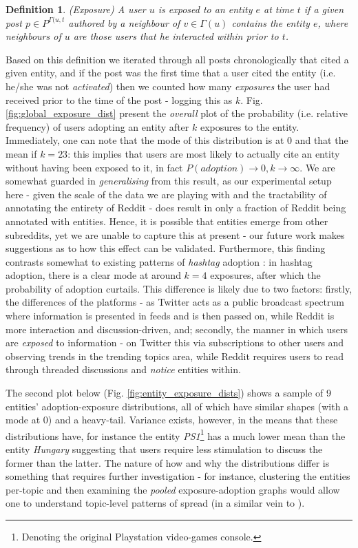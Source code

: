 \documentclass[journal,10pt,draftclsnofoot,onecolumn]{IEEEtran}
\newtheorem{mydef}{Definition}
\begin{document}
\begin{mydef}
\label{def:exposure}
(Exposure) A user $u$ is exposed to an entity $e$ at time $t$ if a given post $p \in P^{\Gamma(u,t}$ authored by a neighbour of $v \in \Gamma(u)$ contains the entity $e$, where neighbours of $u$ are those users that he interacted within prior to $t$.
\end{mydef}

Based on this definition we iterated through all posts chronologically that cited a given entity, and if the post was the first time that a user cited the entity (i.e. he/she was not \emph{activated}) then we counted how many \emph{exposures} the user had received prior to the time of the post - logging this as $k$.
Fig. \ref{fig:global_exposure_dist} present the \emph{overall} plot of the probability (i.e. relative frequency) of users adopting an entity after $k$ exposures to the entity.
Immediately, one can note that the mode of this distribution is at $0$ and that the mean if $k=23$: this implies that users are most likely to actually cite an entity without having been exposed to it, in fact $P(adoption) \rightarrow 0, k \rightarrow \infty$.
We are somewhat guarded in \emph{generalising} from this result, as our experimental setup here - given the scale of the data we are playing with and the tractability of annotating the entirety of Reddit - does result in only a fraction of Reddit being annotated with entities.
Hence, it is possible that entities emerge from other subreddits, yet we are unable to capture this at present - our future work makes suggestions as to how this effect can be validated.
Furthermore, this finding contrasts somewhat to existing patterns of \emph{hashtag} adoption \cite{romero2011differences}: in hashtag adoption, there is a clear mode at around $k=4$ exposures, after which the probability of adoption curtails.
This difference is likely due to two factors: firstly, the differences of the platforms - as Twitter acts as a public broadcast spectrum where information is presented in feeds and is then passed on, while Reddit is more interaction and discussion-driven, and; secondly, the manner in which users are \emph{exposed} to information - on Twitter this via subscriptions to other users and observing trends in the trending topics area, while Reddit requires users to read through threaded discussions and \emph{notice} entities within.

The second plot below (Fig. \ref{fig:entity_exposure_dists}) shows a sample of 9 entities' adoption-exposure distributions, all of which have similar shapes (with a mode at $0$) and a heavy-tail.
Variance exists, however, in the means that these distributions have, for instance the entity \emph{PS1}\footnote{Denoting the original Playstation video-games console.} has a much lower mean than the entity \emph{Hungary} suggesting that users require less stimulation to discuss the former than the latter.
The nature of how and why the distributions differ is something that requires further investigation - for instance, clustering the entities per-topic and then examining the \emph{pooled} exposure-adoption graphs would allow one to understand topic-level patterns of spread (in a similar vein to \cite{romero2011differences}).
\end{document}
